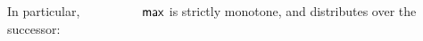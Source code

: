 \begin{code}
\AgdaSpace{}%
\AgdaSpace{}%
\AgdaSpace{}%
\AgdaSpace{}%
\AgdaSpace{}%
\AgdaSpace{}%
\AgdaSpace{}%
\AgdaSpace{}%
\AgdaSpace{}%
\AgdaSpace{}%
\<%
\\
%
\\[\AgdaEmptyExtraSkip]%
%
\>[2]\AgdaSpace{}%
\AgdaSymbol{:}\AgdaSpace{}%
\AgdaSpace{}%
\AgdaSpace{}%
\AgdaSpace{}%
\AgdaSpace{}%
\AgdaSpace{}%
\AgdaSpace{}%
\AgdaSpace{}%
\AgdaSymbol{(}\AgdaSpace{}%
\AgdaSpace{}%
\AgdaSymbol{)}\AgdaSpace{}%
\AgdaSpace{}%
\AgdaSpace{}%
\AgdaSymbol{(}\AgdaSpace{}%
\AgdaSpace{}%
\AgdaSymbol{)}\AgdaSpace{}%
\<%
\\
%
\\[\AgdaEmptyExtraSkip]%
%
\>[2]\AgdaSpace{}%
\AgdaSymbol{:}\AgdaSpace{}%
\AgdaSpace{}%
\AgdaSpace{}%
\AgdaSpace{}%
\AgdaSpace{}%
%
\>[29]\AgdaSpace{}%
\AgdaSymbol{(}\AgdaSpace{}%
\AgdaSpace{}%
\AgdaSymbol{)}\AgdaSpace{}%
\AgdaSpace{}%
\AgdaSpace{}%
\AgdaSpace{}%
\AgdaSpace{}%
\AgdaSymbol{(}\AgdaSpace{}%
\AgdaSpace{}%
\AgdaSymbol{)}\<%
\end{code}

In particular, $\AgdaFunction{max}$ is strictly monotone, and distributes over
the successor:

